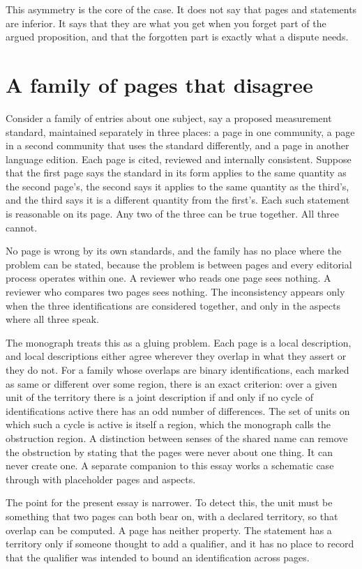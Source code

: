 \documentclass[11pt]{article}
\begin{document}
This asymmetry is the core of the case. It does not say that pages and statements are inferior. It says that they are what you get when you forget part of the argued proposition, and that the forgotten part is exactly what a dispute needs.

\section{A family of pages that disagree}\label{sec:pages}

Consider a family of entries about one subject, say a proposed measurement standard, maintained separately in three places: a page in one community, a page in a second community that uses the standard differently, and a page in another language edition. Each page is cited, reviewed and internally consistent. Suppose that the first page says the standard in its form applies to the same quantity as the second page's, the second says it applies to the same quantity as the third's, and the third says it is a different quantity from the first's. Each such statement is reasonable on its page. Any two of the three can be true together. All three cannot.

No page is wrong by its own standards, and the family has no place where the problem can be stated, because the problem is between pages and every editorial process operates within one. A reviewer who reads one page sees nothing. A reviewer who compares two pages sees nothing. The inconsistency appears only when the three identifications are considered together, and only in the aspects where all three speak.

The monograph treats this as a gluing problem. Each page is a local description, and local descriptions either agree wherever they overlap in what they assert or they do not. For a family whose overlaps are binary identifications, each marked as same or different over some region, there is an exact criterion: over a given unit of the territory there is a joint description if and only if no cycle of identifications active there has an odd number of differences. The set of units on which such a cycle is active is itself a region, which the monograph calls the obstruction region. A distinction between senses of the shared name can remove the obstruction by stating that the pages were never about one thing. It can never create one. A separate companion to this essay works a schematic case through with placeholder pages and aspects.

The point for the present essay is narrower. To detect this, the unit must be something that two pages can both bear on, with a declared territory, so that overlap can be computed. A page has neither property. The statement has a territory only if someone thought to add a qualifier, and it has no place to record that the qualifier was intended to bound an identification across pages.
\end{document}
